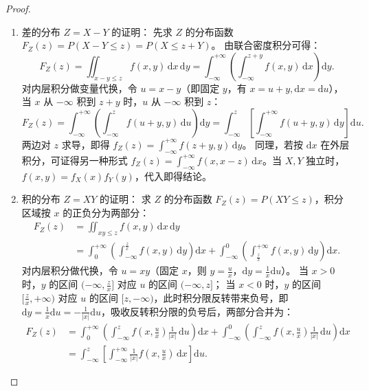 \documentclass[lang=cn,11pt]{elegantbook}
\begin{document}
\begin{proof}
\begin{enumerate}
    \item 差的分布 $Z=X-Y$ 的证明：
    先求 $Z$ 的分布函数 $F_Z(z) = P(X-Y \leqslant z) = P(X \leqslant z+Y)$。
    由联合密度积分可得：
    \[
    F_Z(z) = \iint_{x-y \leqslant z} f(x,y)\,\mathrm{d}x\,\mathrm{d}y = \int_{-\infty}^{+\infty} \left( \int_{-\infty}^{z+y} f(x,y)\,\mathrm{d}x \right) \mathrm{d}y.
    \]
    对内层积分做变量代换，令 $u = x-y$（即固定 $y$，有 $x = u+y, \mathrm{d}x = \mathrm{d}u$），当 $x$ 从 $-\infty$ 积到 $z+y$ 时，$u$ 从 $-\infty$ 积到 $z$：
    \[
    F_Z(z) = \int_{-\infty}^{+\infty} \left( \int_{-\infty}^{z} f(u+y, y)\,\mathrm{d}u \right) \mathrm{d}y = \int_{-\infty}^{z} \left[ \int_{-\infty}^{+\infty} f(u+y, y)\,\mathrm{d}y \right] \mathrm{d}u.
    \]
    两边对 $z$ 求导，即得 $f_Z(z) = \displaystyle\int_{-\infty}^{+\infty}f(z+y, y)\,\mathrm{d}y$。
    同理，若按 $\mathrm{d}x$ 在外层积分，可证得另一种形式 $f_Z(z) = \displaystyle\int_{-\infty}^{+\infty}f(x, x-z)\,\mathrm{d}x$。当 $X, Y$ 独立时，$f(x,y)=f_X(x)f_Y(y)$，代入即得结论。
    \item 积的分布 $Z=XY$ 的证明：
    求 $Z$ 的分布函数 $F_Z(z) = P(XY \leqslant z)$，积分区域按 $x$ 的正负分为两部分：
    \begin{align*}
        F_Z(z) &= \iint_{xy \leqslant z} f(x,y)\,\mathrm{d}x\,\mathrm{d}y \\
        &= \int_{0}^{+\infty} \left( \int_{-\infty}^{\frac{z}{x}} f(x,y)\,\mathrm{d}y \right) \mathrm{d}x + \int_{-\infty}^{0} \left( \int_{\frac{z}{x}}^{+\infty} f(x,y)\,\mathrm{d}y \right) \mathrm{d}x.
    \end{align*}
    对内层积分做代换，令 $u = xy$（固定 $x$，则 $y = \frac{u}{x}$，$\mathrm{d}y = \frac{1}{x}\mathrm{d}u$）。
    当 $x > 0$ 时，$y$ 的区间 $(-\infty, \frac{z}{x}]$ 对应 $u$ 的区间 $(-\infty, z]$；
    当 $x < 0$ 时，$y$ 的区间 $[\frac{z}{x}, +\infty)$ 对应 $u$ 的区间 $[z, -\infty)$，此时积分限反转带来负号，即 $\mathrm{d}y = \frac{1}{x}\mathrm{d}u = -\frac{1}{|x|}\mathrm{d}u$，吸收反转积分限的负号后，两部分合并为：
    \begin{align*}
    F_Z(z) &= \int_{0}^{+\infty} \left( \int_{-\infty}^{z} f\!\left(x,\frac{u}{x}\right)\frac{1}{|x|}\,\mathrm{d}u \right) \mathrm{d}x + \int_{-\infty}^{0} \left( \int_{-\infty}^{z} f\!\left(x,\frac{u}{x}\right)\frac{1}{|x|}\,\mathrm{d}u \right) \mathrm{d}x \\
    &= \int_{-\infty}^{z} \left[ \int_{-\infty}^{+\infty} \frac{1}{|x|}f\!\left(x,\frac{u}{x}\right)\,\mathrm{d}x \right] \mathrm{d}u.

\end{align*}
\end{enumerate}
\end{proof}
\end{document}
